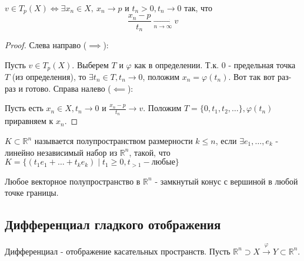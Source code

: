 \begin{statement*}
    $v \in T_p(X) \iff \exists x_n \in X, \ x_n \to p$ и $t_n > 0, t_n \to 0$ так, что 
    \[\frac{x_n - p}{t_n} \underset{n \to \infty}{\to} v\]
    \begin{proof}
        Слева направо ($\implies$):
        \par
        Пусть $v \in T_p(X)$. Выберем $T$ и $\varphi$ как в определении. Т.к. $0$ - предельная точка $T$ (из определения), то $\exists t_n \in T, t_n \to 0$, положим $x_n = \varphi(t_n)$. Вот так вот раз-раз и готово.
        Справа налево ($\impliedby$):
        \par
        Пусть есть $x_n \in X, t_n \to 0$ и $\frac{x_n - p}{t_n} \to v$. Положим $T = \{0, t_1, t_2, \hdots\}, \varphi(t_n)$ приравняем к $x_n$.
    \end{proof}
\end{statement*}

\begin{definition}
    $K \subset \mathbb{R}^n$ называется полупространством размерности $k \leq n$, если $\exists e_1, \hdots, e_k$ - линейно независимый набор из $\mathbb{R}^n$, такой, что $K = \{(t_1e_1 + \hdots + t_ke_k) \mid t_1 \geq 0, t_{>1} - \text{любые}\}$
    \par
    Любое векторное полупространство в $\mathbb{R}^n$ - замкнутый конус с вершиной в любой точке границы.
\end{definition}

\subsection{Дифференциал гладкого отображения}
Дифференциал - отображение касательных пространств. Пусть $\mathbb{R}^n \supset X \overset{\varphi}{\to} Y \subset \mathbb{R}^n$.

